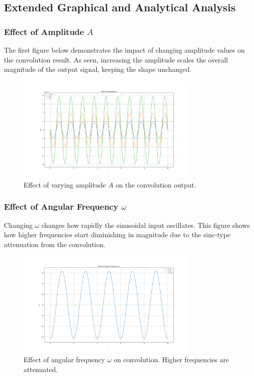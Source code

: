 \newpage

\subsection{Extended Graphical and Analytical Analysis}

\subsubsection{Effect of Amplitude \( A \)}

The first figure below demonstrates the impact of changing amplitude values on the convolution result. As seen, increasing the amplitude scales the overall magnitude of the output signal, keeping the shape unchanged.
\begin{figure}[h]
    \centering
    \includegraphics[width=0.8\textwidth]{codes/codes_sin_2/figs/amp.png}
    \caption{Effect of varying amplitude \( A \) on the convolution output.}
\end{figure}



\subsubsection{Effect of Angular Frequency \( \omega \)}

Changing \( \omega \) changes how rapidly the sinusoidal input oscillates. This figure shows how higher frequencies start diminishing in magnitude due to the sinc-type attenuation from the convolution.
\begin{figure}[h]
    \centering
    \includegraphics[width=0.8\textwidth]{codes/codes_sin_2/figs/omega.png}
    \caption{Effect of angular frequency \( \omega \) on convolution. Higher frequencies are attenuated.}
\end{figure}

